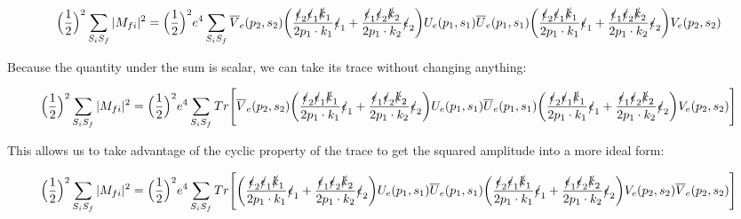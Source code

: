 \documentclass[a4]{article}
\begin{document}
    \begin{equation}
        \Big( \frac{1}{2} \Big)^2 \sum_{S_i S_f} |M_{fi}|^2 = \Big( \frac{1}{2} \Big)^2 e^4 \sum_{S_i S_f} \overline{V}_e (p_2, s_2) \bigg( \frac{\slashed{\epsilon}_2 \slashed{\epsilon}_1 \slashed{k}_1}{2 p_1 \cdot k_1} \slashed{\epsilon}_1  + \frac{\slashed{\epsilon}_1 \slashed{\epsilon}_2 \slashed{k}_2}{2 p_1 \cdot k_2} \slashed{\epsilon}_2 \bigg) U_e (p_1, s_1) \overline{U}_e (p_1, s_1) \bigg( \frac{\slashed{\epsilon}_2 \slashed{\epsilon}_1 \slashed{k}_1}{2 p_1 \cdot k_1} \slashed{\epsilon}_1  + \frac{\slashed{\epsilon}_1 \slashed{\epsilon}_2 \slashed{k}_2}{2 p_1 \cdot k_2} \slashed{\epsilon}_2 \bigg) V_e (p_2, s_2)
    \end{equation}

    Because the quantity under the sum is scalar,  we can take its trace without changing anything:

    \begin{equation}
        \Big( \frac{1}{2} \Big)^2 \sum_{S_i S_f} |M_{fi}|^2 = \Big( \frac{1}{2} \Big)^2 e^4 \sum_{S_i S_f} Tr \Bigg[ \overline{V}_e (p_2, s_2) \bigg( \frac{\slashed{\epsilon}_2 \slashed{\epsilon}_1 \slashed{k}_1}{2 p_1 \cdot k_1} \slashed{\epsilon}_1  + \frac{\slashed{\epsilon}_1 \slashed{\epsilon}_2 \slashed{k}_2}{2 p_1 \cdot k_2} \slashed{\epsilon}_2 \bigg) U_e (p_1, s_1) \overline{U}_e (p_1, s_1) \bigg( \frac{\slashed{\epsilon}_2 \slashed{\epsilon}_1 \slashed{k}_1}{2 p_1 \cdot k_1} \slashed{\epsilon}_1  + \frac{\slashed{\epsilon}_1 \slashed{\epsilon}_2 \slashed{k}_2}{2 p_1 \cdot k_2} \slashed{\epsilon}_2 \bigg) V_e (p_2, s_2) \Bigg]
    \end{equation}

    This allows us to take advantage of the cyclic property of the trace to get the squared amplitude into a more ideal form:

    \begin{equation}
        \Big( \frac{1}{2} \Big)^2 \sum_{S_i S_f} |M_{fi}|^2 = \Big( \frac{1}{2} \Big)^2 e^4 \sum_{S_i S_f} Tr \Bigg[ \bigg( \frac{\slashed{\epsilon}_2 \slashed{\epsilon}_1 \slashed{k}_1}{2 p_1 \cdot k_1} \slashed{\epsilon}_1  + \frac{\slashed{\epsilon}_1 \slashed{\epsilon}_2 \slashed{k}_2}{2 p_1 \cdot k_2} \slashed{\epsilon}_2 \bigg) U_e (p_1, s_1) \overline{U}_e (p_1, s_1) \bigg( \frac{\slashed{\epsilon}_2 \slashed{\epsilon}_1 \slashed{k}_1}{2 p_1 \cdot k_1} \slashed{\epsilon}_1  + \frac{\slashed{\epsilon}_1 \slashed{\epsilon}_2 \slashed{k}_2}{2 p_1 \cdot k_2} \slashed{\epsilon}_2 \bigg) V_e (p_2, s_2) \overline{V}_e (p_2, s_2) \Bigg]
    \end{equation}
\end{document}
